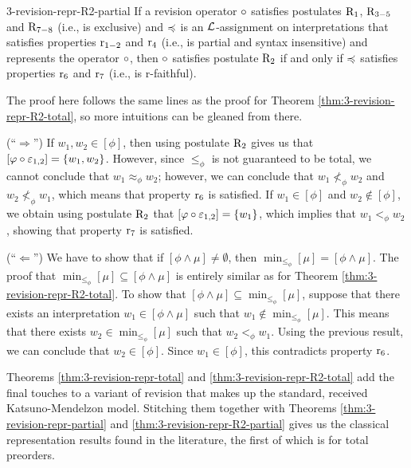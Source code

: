 \begin{thm}{}{3-revision-repr-R2-partial}
	If a revision operator $\circ$ satisfies postulates 
	$\mathrm{R}_{1}$, $\mathrm{R}_{3-5}$ and $\mathrm{R}_{7-8}$ (i.e., is exclusive)
	and $\preccurlyeq$ is an
	$\mathcal{L}$-assignment on interpretations that
	satisfies properties $\mathrm{r}_{1-2}$ and $\mathrm{r}_{4}$ 
	(i.e., is partial and syntax insensitive) 
	and represents the operator $\circ$,
	then 
	$\circ$ satisfies postulate $\mathrm{R}_{2}$ if and only if
	$\preccurlyeq$ satisfies properties $\mathrm{r}_{6}$ and $\mathrm{r}_{7}$
	(i.e., is r-faithful).
\end{thm}
\begin{prf*}{}{}%
	The proof here follows the same lines as the proof for 
	Theorem \ref{thm:3-revision-repr-R2-total},
	so more intuitions can be gleaned from there.

	(``$\Rightarrow$'')
	If $w_1,w_2\in[\phi]$,
	then using postulate $\mathrm{R}_{2}$ gives us that $[\varphi\circ\varepsilon_{1,2}]=\{w_1,w_2\}$.
	However, since $\le_{\phi}$ is not guaranteed to be total, we cannot conclude 
	that $w_1\approx_{\phi}w_2$; however, we can conclude that $w_1\not<_{\phi}w_2$
	and $w_2\not<_{\phi}w_1$, which means that property $\mathrm{r}_{6}$ is satisfied.
	If $w_1\in[\phi]$ and $w_2\notin[\phi]$, we obtain using postulate $\mathrm{R}_{2}$ that 
	$[\varphi\circ\varepsilon_{1,2}]=\{w_1\}$, which implies that $w_1<_{\phi}w_2$, 
	showing that property $\mathrm{r}_{7}$ is satisfied.

	(``$\Leftarrow$'')
	We have to show that if $[\phi\land\mu]\neq\emptyset$,
	then $\min_{\le_{\phi}}[\mu]=[\phi\land\mu]$.
	The proof that $\min_{\le_{\phi}}[\mu]\subseteq[\phi\land\mu]$ 
	is entirely similar as for Theorem \ref{thm:3-revision-repr-R2-total}.
	To show that $[\phi\land\mu]\subseteq\min_{\le_{\phi}}[\mu]$,
	suppose that there exists an interpretation $w_1\in[\phi\land\mu]$
	such that $w_1\notin\min_{\le_{\phi}}[\mu]$.
	This means that there exists $w_2\in\min_{\le_{\phi}}[\mu]$
	such that $w_2<_{\phi}w_1$.
	Using the previous result, we can conclude that $w_2\in[\phi]$.
	Since $w_1\in[\phi]$, this contradicts property $\mathrm{r}_{6}$.
\end{prf*}

Theorems \ref{thm:3-revision-repr-total} and \ref{thm:3-revision-repr-R2-total} 
add the final touches to a variant of revision that makes up the 
standard, received Katsuno-Mendelzon model.
Stitching them together with 
Theorems \ref{thm:3-revision-repr-partial} and \ref{thm:3-revision-repr-R2-partial}
gives us the classical  representation results found in the literature,
the first of which is for total preorders.

